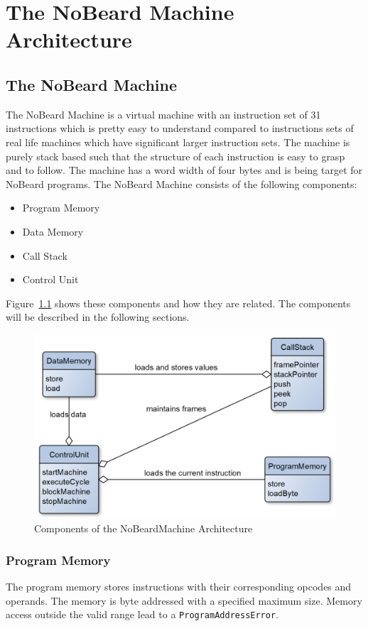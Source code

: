 \chapter{The NoBeard Machine Architecture}
\lstset{language=NoBeardAsm}
\section{The NoBeard Machine}
The NoBeard Machine is a virtual machine with an instruction set of 31 instructions which is pretty easy to understand compared to instructions sets of real life machines which have significant larger instruction sets. The machine is purely stack based such that the structure of each instruction is easy to grasp and to follow. The machine has a word width of four bytes and is being target for NoBeard programs. The NoBeard Machine consists of the following components:
\begin{itemize}
	\item Program Memory
	\item Data Memory
	\item Call Stack
	\item Control Unit
\end{itemize}
Figure~\ref{fig:componentsOfNbM} shows these components and how they are related. The components will be described in the following sections.

\begin{figure}
	\centering
	\includegraphics[scale=.62]{images/componentsOfNbM.png}
	\caption{Components of the NoBeardMachine Architecture}
	\label{fig:componentsOfNbM}
\end{figure}
\subsection{Program Memory}
The program memory stores instructions with their corresponding opcodes and operands. The memory is byte addressed with a specified  maximum size. Memory access outside the valid range lead to a \lstinline$ProgramAddressError$.

